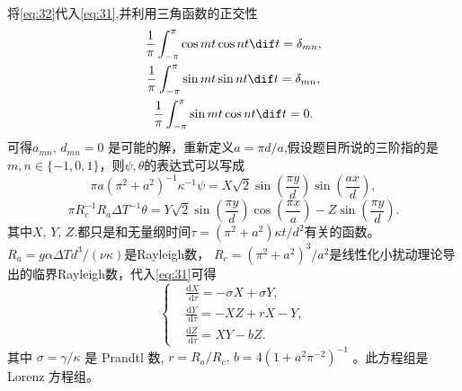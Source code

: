 \documentclass[12pt]{ctexart}
\begin{document}
将\cref{eq:32}代入\cref{eq:31},并利用三角函数的正交性
\begin{gather}
	\frac{1}{\pi} \int^\pi_{-\pi} \cos mt \cos nt \dif t = \delta_{mn},\\
	\frac{1}{\pi} \int^\pi_{-\pi} \sin mt \sin nt \dif t = \delta_{mn},\\
	\frac{1}{\pi} \int^\pi_{-\pi} \sin mt \cos nt \dif t = 0.
\end{gather}
可得$a_{mn},\, d_{mn} = 0$ 是可能的解，重新定义$a=\pi d/a$,假设题目所说的三阶指的是$m,n \in \{-1,0,1\}$，则$\psi,\theta$的表达式可以写成\cite[P252]{shi}
\begin{equation}
	\pi a \left(\pi^2+a^2\right)^{-1} \kappa^{-1} \psi = X \sqrt{2} \sin \left(\frac{\pi y}{d}\right) \sin \left(\frac{a x}{d}\right),
	\label{eq:33}
\end{equation}
\begin{equation}
	\pi R_c^{-1}R_a \Delta T^{-1} \theta= Y \sqrt{2} \sin \left(\frac{\pi y}{d}\right) \cos \left(\frac{\pi x}{a}\right)- Z \sin \left(\frac{\pi y}{d}\right).
	\label{eq:34}
\end{equation}
其中$X,\, Y,\, Z.$都只是和无量纲时间$\tau = (\pi^2 + a^2)\kappa t / d^2$有关的函数。 $R_a = g \alpha \Delta T d^3 / (\nu \kappa)$是Rayleigh数， $R_c = (\pi^2+a^2)^3/a^2$是线性化小扰动理论导出的临界Rayleigh数，代入\cref{eq:31}可得
\begin{equation}
	\left\{
	\begin{aligned}
		 & \frac{\mathrm{d} X}{\mathrm{~d} \tau}=-\sigma X+\sigma Y, \\
		 & \frac{\mathrm{d} Y}{\mathrm{~d} \tau}=-X Z+r X-Y,         \\
		 & \frac{\mathrm{d} Z}{\mathrm{~d} \tau}=X Y-b Z.
	\end{aligned}
	\right.
	\label{eq:3lorenz}
\end{equation}
其中 $\sigma=\gamma / \kappa$ 是 Prandtl 数, $r=R_{a} / R_{c},\, b=4\left(1+a^{2} \pi^{-2}\right)^{-1}$ 。此方程组是 Lorenz 方程组。
\end{document}
